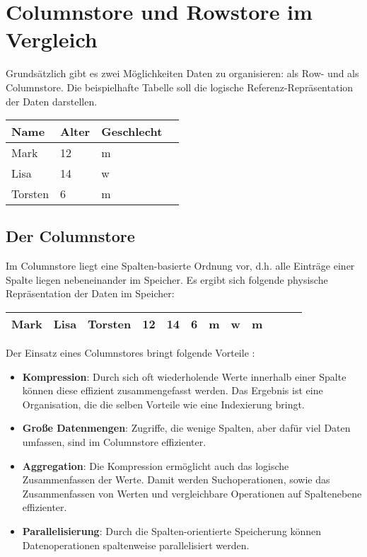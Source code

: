 \chapter{Columnstore und Rowstore im Vergleich}\label{chapter:col_row}

Grundsätzlich gibt es zwei Möglichkeiten Daten zu organisieren: als Row- und als Columnstore. Die beispielhafte Tabelle soll die logische Referenz-Repräsentation der Daten darstellen.

\begin{center}
    \begin{tabular}{ | l | l | l | l |}
    \hline
    Name & Alter & Geschlecht \\ \hline
    Mark & 12 & m \\ \hline
    Lisa & 14 & w \\ \hline
    Torsten & 6 & m \\ \hline
    \end{tabular}
\end{center}

\section{Der Columnstore}
\label{sec:col_store}
Im Columnstore liegt eine Spalten-basierte Ordnung vor, d.h. alle Einträge einer Spalte liegen nebeneinander im Speicher. Es ergibt sich folgende physische Repräsentation der Daten im Speicher: 

\begin{center}
    \begin{tabular}{ | l | l | l | l | l | l | l | l | l | l | l | l |}
    \hline
    Mark & Lisa & Torsten & 12 & 14 & 6 & m & w & m \\ \hline
    \end{tabular}
\end{center}

Der Einsatz eines Columnstores bringt folgende Vorteile \cite[vgl.][]{column, rowandcolumn}: 

\begin{itemize}
	\item \textbf{Kompression}: Durch sich oft wiederholende Werte innerhalb einer Spalte können diese effizient zusammengefasst werden. Das Ergebnis ist eine Organisation, die die selben Vorteile wie eine Indexierung bringt. 
    \item \textbf{Große Datenmengen}: Zugriffe, die wenige Spalten, aber dafür viel Daten umfassen, sind im Columnstore effizienter. 
	\item \textbf{Aggregation}: Die Kompression ermöglicht auch das  logische Zusammenfassen der Werte. Damit werden Suchoperationen, sowie das Zusammenfassen von Werten und vergleichbare Operationen auf Spaltenebene effizienter. 
    \item \textbf{Parallelisierung}: Durch die Spalten-orientierte Speicherung können Datenoperationen spaltenweise parallelisiert werden. 
\end{itemize}

